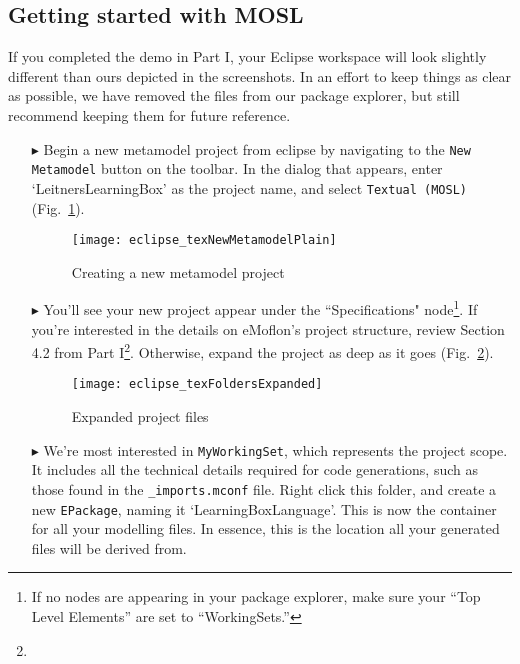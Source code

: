 \clearpage
\subsection{Getting started with MOSL}
\texHeader
\hypertarget{static:starting tex}{}

\hypertarget{static tex}{} 

{\footnotesize If you completed the demo in Part I, your Eclipse workspace will look slightly different than ours depicted in the screenshots. In an effort to
keep things as clear as possible, we have removed the files from our package explorer, but still recommend keeping them for future reference.}

\begin{itemize}
\item[$\blacktriangleright$] Begin a new metamodel project from eclipse by navigating to the \texttt{New Metamodel} button on the toolbar. In the dialog that
appears, enter `LeitnersLearningBox' as the project name, and select \texttt{Textual (MOSL)}  (Fig.~\ref{fig:new_project}).

\vspace{0.5cm}

\begin{figure}[htbp]
	\centering
  \texttt{[image: eclipse\_texNewMetamodelPlain]}
	\caption{Creating a new metamodel project}
	\label{fig:new_project}
\end{figure}

\vspace{0.5cm}

\item[$\blacktriangleright$] You'll see your new project appear under the ``Specifications" node\footnote{If no nodes are appearing in your package explorer,
make sure your ``Top Level Elements'' are set to ``WorkingSets.''}. If you're interested in the details on eMoflon's project structure, review Section 4.2 from
Part I\footnote{\downLink}. Otherwise, expand the project as deep as it goes (Fig.~\ref{fig:expanded_folders}).

\clearpage

\begin{figure}[htbp]
	\centering
  \texttt{[image: eclipse\_texFoldersExpanded]}
	\caption{Expanded project files}
	\label{fig:expanded_folders}
\end{figure} 

\vspace{0.25cm}

\item[$\blacktriangleright$] We're most interested in \texttt{MyWorkingSet}, which represents the project scope. It includes all the technical details required
for code generations, such as those found in the \texttt{\_imports.mconf} file. Right click this folder, and create a new \texttt{EPackage}, naming it
`LearningBoxLanguage'. This is now the container for all your modelling files. In essence, this is the location all your generated files will be derived from.


\end{itemize}

